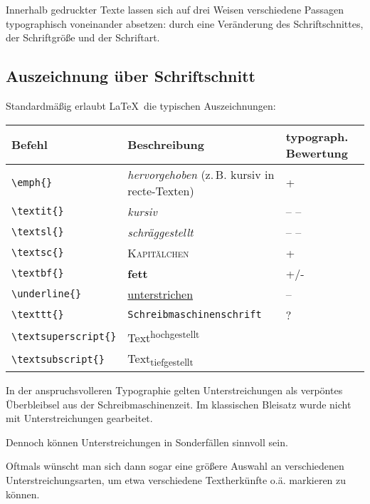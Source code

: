 
Innerhalb gedruckter Texte lassen sich auf drei Weisen verschiedene Passagen typographisch voneinander
absetzen:
durch eine Veränderung des Schriftschnittes,
der Schriftgröße und
der Schriftart.

\subsection{Auszeichnung über Schriftschnitt}

Standardmäßig erlaubt \LaTeX\ die typischen Auszeichnungen:

\begin{center}
\begin{tabular}{lll}
      Befehl &		Beschreibung & typograph. Bewertung \\
      \hline
 \lstinline/\emph{}/ 		&	\emph{hervorgehoben} (z.\,B. kursiv in recte-Texten) 		&	+ \\
 \lstinline/\textit{}/		&		\textsl{kursiv} &	-- -- \\
 \lstinline/\textsl{}/		&		\textsl{schräggestellt} &	-- -- \\
 \lstinline/\textsc{}/		&		\textsc{Kapitälchen}	&	+ \\
 \lstinline/\textbf{}/ 		&		\textbf{fett} 		&	+/- \\
 \lstinline/\underline{}/ 	&		\underline{unterstrichen} &	-- \\
 \lstinline/\texttt{}/		&		\texttt{Schreibmaschinenschrift} &	? \\
 \lstinline/\textsuperscript{}/ &	Text\textsuperscript{hochgestellt} &	\\
 \lstinline/\textsubscript{}/ &		Text\textsubscript{tiefgestellt} & \\
 \end{tabular} 
\end{center}


In der anspruchsvolleren Typographie gelten Unterstreichungen als verpöntes Überbleibsel
aus der Schreibmaschinenzeit. Im klassischen Bleisatz wurde nicht mit Unterstreichungen
gearbeitet.

Dennoch können Unterstreichungen in Sonderfällen sinnvoll sein.

Oftmals wünscht man sich dann sogar eine größere Auswahl an verschiedenen 
Unterstreichungsarten, um etwa verschiedene Textherkünfte o.ä. markieren zu können.

